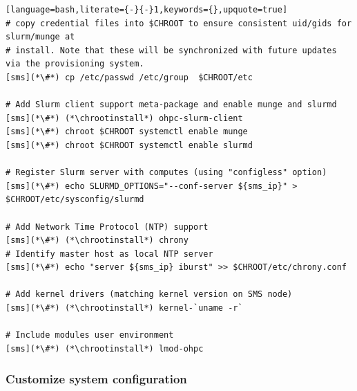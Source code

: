 \documentclass[letterpaper]{article}
\newcommand{\chrootinstall}{dnf -y --installroot=\$CHROOT install}
\begin{document}
\begin{lstlisting}[language=bash,literate={-}{-}1,keywords={},upquote=true]
# copy credential files into $CHROOT to ensure consistent uid/gids for slurm/munge at
# install. Note that these will be synchronized with future updates via the provisioning system.
[sms](*\#*) cp /etc/passwd /etc/group  $CHROOT/etc

# Add Slurm client support meta-package and enable munge and slurmd
[sms](*\#*) (*\chrootinstall*) ohpc-slurm-client
[sms](*\#*) chroot $CHROOT systemctl enable munge
[sms](*\#*) chroot $CHROOT systemctl enable slurmd

# Register Slurm server with computes (using "configless" option)
[sms](*\#*) echo SLURMD_OPTIONS="--conf-server ${sms_ip}" > $CHROOT/etc/sysconfig/slurmd

# Add Network Time Protocol (NTP) support
[sms](*\#*) (*\chrootinstall*) chrony
# Identify master host as local NTP server
[sms](*\#*) echo "server ${sms_ip} iburst" >> $CHROOT/etc/chrony.conf

# Add kernel drivers (matching kernel version on SMS node)
[sms](*\#*) (*\chrootinstall*) kernel-`uname -r`

# Include modules user environment
[sms](*\#*) (*\chrootinstall*) lmod-ohpc
\end{lstlisting}

\vspace*{.2cm}
\subsubsection{Customize system configuration} \label{sec:master_customization}






\end{document}
